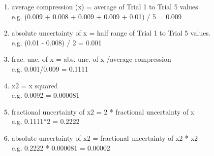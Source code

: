 \begin{enumerate}
    \item average compression (x) = average of Trial 1 to Trial 5 values \\
    e.g. (0.009 + 0.008 + 0.009 + 0.009 + 0.01) / 5 = 0.009
    \item absolute uncertainty of x = half range of Trial 1 to Trial 5 values. \\
    e.g. (0.01 - 0.008) / 2 = 0.001
    \item frac. unc. of x = abs. unc. of x /average compression \\
    e.g. 0.001/0.009 = 0.1111
    \item x2 = x squared \\
    e.g. 0.0092 = 0.000081
    \item fractional uncertainty of x2 = 2 * fractional uncertainty of x \\
    e.g. 0.1111*2 = 0.2222
    \item absolute uncertainty of x2 = fractional uncertainty of x2 * x2 \\
    e.g. 0.2222 * 0.000081 = 0.00002 
\end{enumerate}